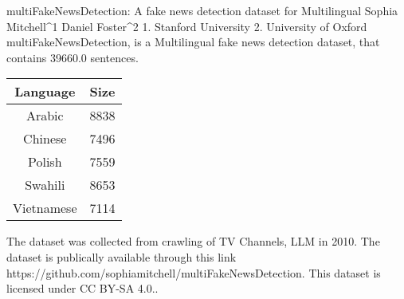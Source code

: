 
multiFakeNewsDetection: A fake news detection dataset for Multilingual
Sophia Mitchell^1 Daniel Foster^2
1. Stanford University 2. University of Oxford
multiFakeNewsDetection, is a Multilingual fake news detection dataset, that contains 39660.0 sentences.

    \begin{table}[h]
    \centering
    \begin{tabular}{|c|c|}
    \hline
    Language & Size \\
    \hline
    Arabic & 8838 \\ 
Chinese & 7496 \\ 
Polish & 7559 \\ 
Swahili & 8653 \\ 
Vietnamese & 7114 \\ 
 \hline
    \end{tabular}
    \end{table}
    
The dataset was collected from crawling of TV Channels, LLM in 2010. 
The dataset is publically available through this link https://github.com/sophiamitchell/multiFakeNewsDetection. This dataset is licensed under CC BY-SA 4.0..

